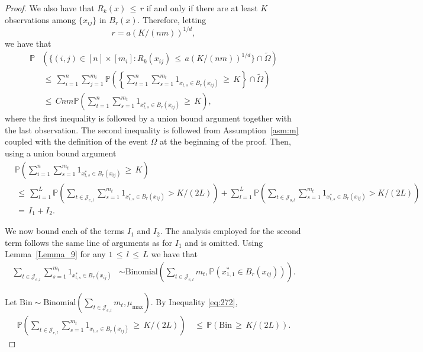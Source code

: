 \documentclass[twoside,11pt]{article}
\begin{document}
\begin{proof}
We also have that $R_k(x) \,\leq\, r$ if and only if there are at least $K$ observations among $\{x_{ij}\}$ in $B_r(x)$. Therefore, letting
\begin{equation}
r = a(K/(nm))^{1/d},
\label{eq:276}
\end{equation}
we have that
\begin{align}
\mathbb{P} &\left( \{(i,j) \in [n] \times [m_i] : R_k(x_{ij}) \,\leq\, a(K/(nm))^{1/d}\} \cap \tilde \Omega \right) \nonumber \\
&\,\leq\, \sum_{i=1}^{n} \sum_{j=1}^{m_i} \mathbb{P}\left( \left\{ \sum_{t=1}^{n}\sum_{s=1}^{m_t} 1_{ x_{t,s} \in B_{r}(x_{ij}) } \,\geq\, K \right\}\cap \tilde \Omega \right) \nonumber \\
&\,\leq\, Cnm \mathbb{P}\left( \sum_{t=1}^n\sum_{s=1}^{m_t} 1_{x_{t,s}^* \in B_{r}(x_{ij})} \,\geq\, K \right), \label{eq:277}
\end{align}
where the first inequality is followed by a union bound argument together with the last observation. The second inequality is followed from Assumption~\ref{asm:m} coupled with the definition of the event $\Omega$ at the beginning of the proof. Then, using a union bound argument
\begin{align}
&\mathbb{P} \left( \sum_{i=1}^{n} \sum_{s=1}^{m_t} 1_{x_{t,s}^* \in B_{r}(x_{ij})} \,\geq\, K \right) 
\\& \,\leq\, \sum_{l=1}^{L} \mathbb{P}\left(\sum_{t \in \mathcal{J}_{e,l}}\sum_{s=1}^{m_t} 1_{x_{t,s}^* \in B_{r}(x_{ij})} > K/(2L) \right) \nonumber  + \sum_{l=1}^{L} \mathbb{P}\left(\sum_{t \in \mathcal{J}_{o,l}}\sum_{s=1}^{m_t} 1_{x_{t,s}^* \in B_{r}(x_{ij})} > K/(2L) \right) \nonumber \\
&\,=\, I_1 + I_2. \label{eq:278}
\end{align}

We now bound each of the terms \( I_1 \) and \( I_2 \). The analysis employed for the second term follows the same line of arguments as for \( I_1 \) and is omitted. Using Lemma~\ref{Lemma_9} for any \( 1 \,\leq\, l \,\leq\, L \) we have that
\begin{align}
    \sum_{t \in \mathcal{J}_{e,l}} \sum_{s=1}^{m_t} 1_{x_{t,s}^* \in B_{r}(x_{ij})} 
    &\sim \text{Binomial} \left( \sum_{t \in \mathcal{J}_{e,l}} m_t, \mathbb{P}(x_{1,1}^* \in B_{r}(x_{ij})) \right). \label{eq:279}
\end{align}

Let \( \text{Bin} \sim \text{Binomial}\left(\sum_{t \in \mathcal{J}_{e,l}} m_t, \mu_{\max} \right) \). By Inequality \eqref{eq:272},
\begin{align}
    \mathbb{P}\left( \sum_{t \in \mathcal{J}_{e,l}} \sum_{s=1}^{m_t} 1_{x_{t,s} \in B_{r}(x_{ij})} \,\geq\, K/(2L) \right) 
    &\,\leq\, \mathbb{P}(\text{Bin} \,\geq\, K/(2L)). \label{eq:280}
\end{align}


\end{proof}
\end{document}
